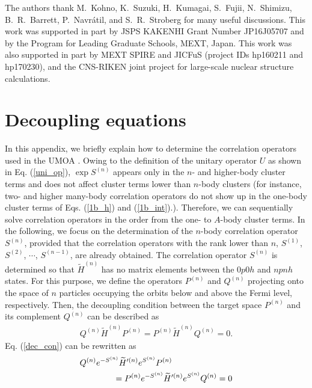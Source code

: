 \documentclass[aps,prc, dvips, twocolumn,groupedaddress,showkeys,showpacs,floatfix,superscriptaddress]{revtex4-1}
\newcommand{\<}{\langle}
\renewcommand{\>}{\rangle}
\begin{document}
\begin{acknowledgments}
The authors thank M.~Kohno, K.~Suzuki, H.~Kumagai, S.~Fujii, N.~Shimizu,
 B.~R.~Barrett, P.~Navr\'atil, and S.~R.~Stroberg
for many useful discussions.
This work was supported in part by JSPS KAKENHI Grant Number JP16J05707
 and by the Program for Leading Graduate Schools, MEXT, Japan.
This work was also supported in part by MEXT SPIRE and JICFuS (project IDs hp160211 and hp170230), and the CNS-RIKEN joint project for large-scale nuclear structure calculations.
\end{acknowledgments}


\appendix

\section{Decoupling equations \label{sec:dec_eq}}
In this appendix, we briefly explain how to determine the correlation operators used in the UMOA \cite{Suzuki:1982}.
Owing to the definition of the unitary operator $U$ as shown in Eq. (\ref{uni_op}),
 $\exp S^{(n)}$ appears only in the $n$- and higher-body cluster terms and does
 not affect cluster terms lower than $n$-body clusters
 (for instance, two- and higher many-body correlation operators do not show up in the one-body cluster terms of Eqs. (\ref{1b_h}) and (\ref{1b_int}).).
Therefore, we can sequentially solve correlation operators in the order from  the one- to $A$-body cluster terms.
In the following, we focus on the determination of the $n$-body correlation operator $S^{(n)}$, provided
 that the correlation operators with the rank lower than $n$,  $S^{(1)}$, $S^{(2)}$, $\cdots$, $S^{(n-1)}$, are already obtained.
The correlation operator $S^{(n)}$ is determined
 so that $\widetilde{H}^{(n)}$ has no matrix elements between the $0p0h$ and $npnh$ states.
For this purpose, we define the operators $P^{(n)}$ and $Q^{(n)}$
 projecting onto the space of $n$ particles occupying the orbits below
 and above the Fermi level, respectively.
Then, the decoupling condition between the target space $P^{(n)}$ and its complement $Q^{(n)}$ can be described as
\begin{align}
\label{dec_con}
 Q^{(n)}\widetilde{H}^{(n)}P^{(n)}
= P^{(n)}\widetilde{H}^{(n)}Q^{(n)}=0 .
\end{align}
Eq. (\ref{dec_con}) can be rewritten as
\begin{align}
& Q^{(n)}e^{-S^{(n)}}\widetilde{H}'^{(n)}e^{S^{(n)}}P^{(n)} \notag \\
 \label{dec_con2}
&\hspace{4em} =P^{(n)}e^{-S^{(n)}}\widetilde{H}'^{(n)}e^{S^{(n)}}Q^{(n)}=0
\end{align}
\end{document}
